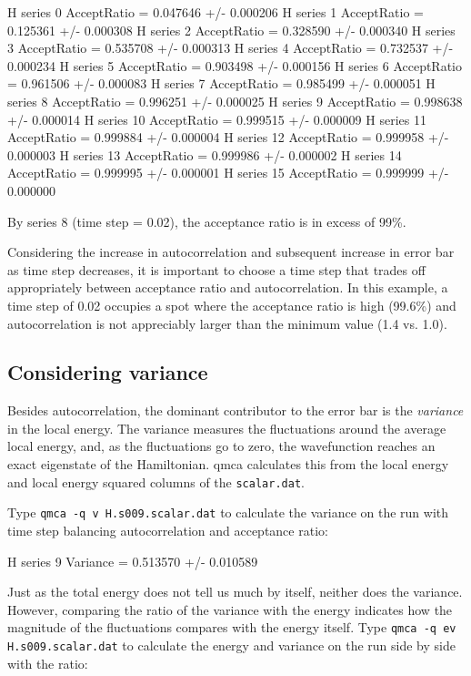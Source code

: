 \begin{shade} 
H  series 0  AcceptRatio = 0.047646 +/- 0.000206 
H  series 1  AcceptRatio = 0.125361 +/- 0.000308 
H  series 2  AcceptRatio = 0.328590 +/- 0.000340 
H  series 3  AcceptRatio = 0.535708 +/- 0.000313 
H  series 4  AcceptRatio = 0.732537 +/- 0.000234 
H  series 5  AcceptRatio = 0.903498 +/- 0.000156 
H  series 6  AcceptRatio = 0.961506 +/- 0.000083 
H  series 7  AcceptRatio = 0.985499 +/- 0.000051 
H  series 8  AcceptRatio = 0.996251 +/- 0.000025 
H  series 9  AcceptRatio = 0.998638 +/- 0.000014 
H  series 10  AcceptRatio = 0.999515 +/- 0.000009 
H  series 11  AcceptRatio = 0.999884 +/- 0.000004 
H  series 12  AcceptRatio = 0.999958 +/- 0.000003 
H  series 13  AcceptRatio = 0.999986 +/- 0.000002 
H  series 14  AcceptRatio = 0.999995 +/- 0.000001 
H  series 15  AcceptRatio = 0.999999 +/- 0.000000 
\end{shade}

By series 8 (time step = 0.02), the acceptance ratio is in excess of 99\%.  

Considering the increase in autocorrelation and subsequent increase in error
bar as time step decreases, it is important to choose a time step that trades
off appropriately between acceptance ratio and autocorrelation.  In this
example, a time step of 0.02 occupies a spot where the acceptance ratio is high
(99.6\%) and autocorrelation is not appreciably larger than the minimum value
(1.4 vs. 1.0).

\subsection{Considering variance}

Besides autocorrelation, the dominant contributor to the error bar is the
\textit{variance} in the local energy.  The variance measures the fluctuations
around the average local energy, and, as the fluctuations go to zero, the wavefunction reaches an exact eigenstate of the Hamiltonian.  qmca calculates this
from the local energy and local energy squared columns of the \texttt{scalar.dat}. 

Type \texttt{qmca -q v H.s009.scalar.dat} to calculate the variance on the run
with time step balancing autocorrelation and acceptance ratio:

\begin{shade}
H  series 9  Variance = 0.513570 +/- 0.010589  
\end{shade}

Just as the total energy does not tell us much by itself, neither does the
variance.  However, comparing the ratio of the variance with the energy indicates
how the magnitude of the fluctuations compares with the energy itself.   Type
\texttt{qmca -q ev H.s009.scalar.dat} to calculate the energy and variance on
the run side by side with the ratio:

